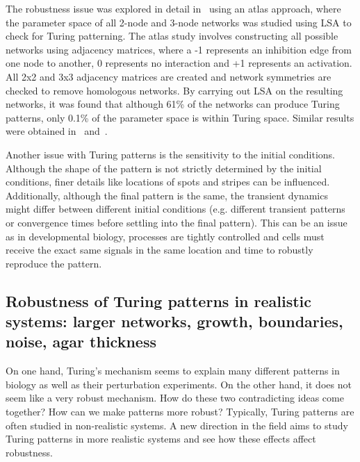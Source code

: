 The robustness issue was explored in detail in~\cite{Scholes2019} using an atlas approach, where the parameter space of all 2-node and 3-node networks was studied using LSA to check for Turing patterning.
The atlas study involves constructing all possible networks using adjacency matrices, where a -1 represents an inhibition edge from one node to another, 0 represents no interaction and +1 represents an activation.
All 2x2 and 3x3 adjacency matrices are created and network symmetries are checked to remove homologous networks.
By carrying out LSA on the resulting networks, it was found that although 61\% of the networks can produce Turing patterns, only 0.1\% of the parameter space is within Turing space.
Similar results were obtained in~\cite{Zheng2016} and~\cite{Marcon}.


Another issue with Turing patterns is the sensitivity to the initial conditions.
Although the shape of the pattern is not strictly determined by the initial conditions, finer details like locations of spots and stripes can be influenced.
Additionally, although the final pattern is the same, the transient dynamics might differ between different initial conditions (e.g. different transient patterns or convergence times before settling into the final pattern).
This can be an issue as in developmental biology, processes are tightly controlled and cells must receive the exact same signals in the same location and time to robustly reproduce the pattern. %





\subsection{Robustness of Turing patterns in realistic systems: larger networks, growth, boundaries, noise, agar thickness}
On one hand, Turing's mechanism seems to explain many different patterns in biology as well as their perturbation experiments.
On the other hand, it does not seem like a very robust mechanism.
How do these two contradicting ideas come together?
How can we make patterns more robust?
Typically, Turing patterns are often studied in non-realistic systems.
A new direction in the field aims to study Turing patterns in more realistic systems and see how these effects affect robustness.


